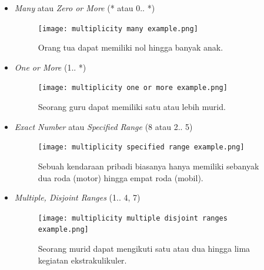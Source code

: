 \documentclass[a4paper]{article}
\begin{document}
\begin{enumerate}
\begin{itemize}
\begin{figure}[h]
        \end{figure}
        \item \textit{Many} atau \textit{Zero or More} (* atau 0.. *)\\
        \begin{figure}[h]
            \centering
            \texttt{[image: multiplicity many example.png]}\\
            \caption{Orang tua dapat memiliki nol hingga banyak anak.}
        \end{figure}
        \item \textit{One or More} (1.. *)\\
        \begin{figure}[h]
            \centering
            \texttt{[image: multiplicity one or more example.png]}\\
            \caption{Seorang guru dapat memiliki satu atau lebih murid.}
        \end{figure}
        \newpage
        \item \textit{Exact Number} atau \textit{Specified Range} (8 atau 2.. 5)\\
        \begin{figure}[h]
            \centering
            \texttt{[image: multiplicity specified range example.png]}\\
            \caption{Sebuah kendaraan pribadi biasanya hanya memiliki sebanyak dua roda (motor) hingga empat roda (mobil).}
        \end{figure}
        \item \textit{Multiple, Disjoint Ranges} (1.. 4, 7)\\
        \begin{figure}[h]
            \centering
            \texttt{[image: multiplicity multiple disjoint ranges example.png]}\\
            \caption{Seorang murid dapat mengikuti satu atau dua hingga lima kegiatan ekstrakulikuler.}
        \end{figure}
    \end{itemize}
    

\end{enumerate}
\end{document}
